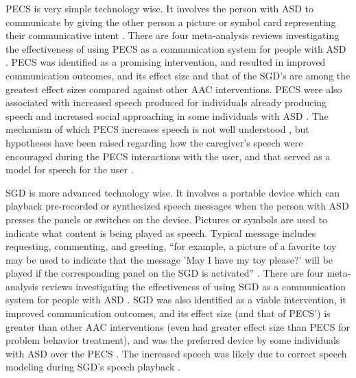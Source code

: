 \documentclass{ut-thesis}
\begin{document}
PECS is very simple technology wise.  It involves the person with ASD to communicate by giving the other person a picture or symbol card representing their communicative intent \cite{bondy1994picture}.  There are four meta-analysis reviews investigating the effectiveness of using PECS as a communication system for people with ASD \cite{ganz2012meta, ganz2012metab, sulzer2009picture, tincani2010quantitative}.  PECS was identified as a promising intervention, and resulted in improved communication outcomes, and its effect size and that of the SGD's are among the greatest effect sizes compared against other AAC interventions.  PECS were also associated with increased speech produced for individuals already producing speech and increased social approaching in some individuals with ASD \cite{lang2014assistive}.  The mechanism of which PECS increases speech is not well understood \cite{preston2009review}, but hypotheses have been raised regarding how the caregiver's speech were encouraged during the PECS interactions with the user, and that served as a model for speech for the user \cite{yoder2006randomized}.

SGD is more advanced technology wise.  It involves a portable device which can playback pre-recorded or synthesized speech messages when the person with ASD presses the panels or switches on the device.  Pictures or symbols are used to indicate what content is being played as speech.  Typical message includes requesting, commenting, and greeting, ``for example, a picture of a favorite toy may be used to indicate that the message 'May I have my toy please?' will be played if the corresponding panel on the SGD is activated'' \cite{lang2014assistive}.  There are four meta-analysis reviews investigating the effectiveness of using SGD as a communication system for people with ASD \cite{van2010communication, van2011assessing, ganz2012metab, ganz2013moderation}.  SGD was also identified as a viable intervention, it improved communication outcomes, and its effect size (and that of PECS') is greater than other AAC interventions (even had greater effect size than PECS for problem behavior treatment), and was the preferred device by some individuals with ASD over the PECS \cite{lang2014assistive}.  The increased speech was likely due to correct speech modeling during SGD's speech playback \cite{schlosser2008effects}.
\end{document}
